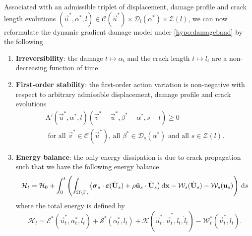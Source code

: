 Associated with an admissible triplet of displacement, damage profile and crack length evolutions $(\vec{u}^*,\alpha^*,l)\in\mathcal{C}(\vec{u}^*)\times\mathcal{D}_l(\alpha^*)\times\mathcal{Z}(l)$, we can now reformulate the dynamic gradient damage model under \cref{hypo:damageband} by the following
\begin{definition} \noindent \label{def:dynagraddamanew}
\begin{enumerate}
\item \textbf{Irreversibility}: the damage $t\mapsto\alpha_t$ and the crack length $t\mapsto l_t$ are a non-decreasing function of time.
\item \textbf{First-order stability}: the first-order action variation is non-negative with respect to arbitrary admissible displacement, damage profile and crack evolutions
\begin{multline} \label{eq:vi2}
\mathrm{A}'(\vec{u}^*,\alpha^*,l)(\vec{v}^*-\vec{u}^*,\beta^*-\alpha^*,s-l)\geq 0 \\
\text{ for all $\vec{v}^*\in\mathcal{C}(\vec{u}^*)$, all $\beta^*\in\mathcal{D}_s(\alpha^*)$ and all $s\in\mathcal{Z}(l)$}.
\end{multline}
\item \textbf{Energy balance}: the only energy dissipation is due to crack propagation such that we have the following energy balance
\begin{equation} \label{eq:dyngdeb3}
\mathcal{H}_t=\mathcal{H}_0+\int_0^t\left(\int_{\Omega\setminus\Gamma_s}\bigl(\sig_s\cdot\eps(\dot{\vec{U}}_s)+\rho\ddot{\vec{u}}_s\cdot\dot{\vec{U}}_s\bigr)\dx-\mathcal{W}_s(\dot{\vec{U}}_s)-\dot{\mathcal{W}}_s(\vec{u}_s)\right)\D{s}
\end{equation}
where the total energy is defined by
\begin{equation}
\mathcal{H}_t=\mathcal{E}^*(\vec{u}_t^*,\alpha_t^*,l_t)+\mathcal{S}^*(\alpha_t^*,l_t)+\mathcal{K}(\vec{u}_t^*,\dot{\vec{u}}_t^*,l_t,\dot{l}_t)-\mathcal{W}_t^*(\vec{u}_t^*,l_t).
\end{equation}
\end{enumerate}
\end{definition}

